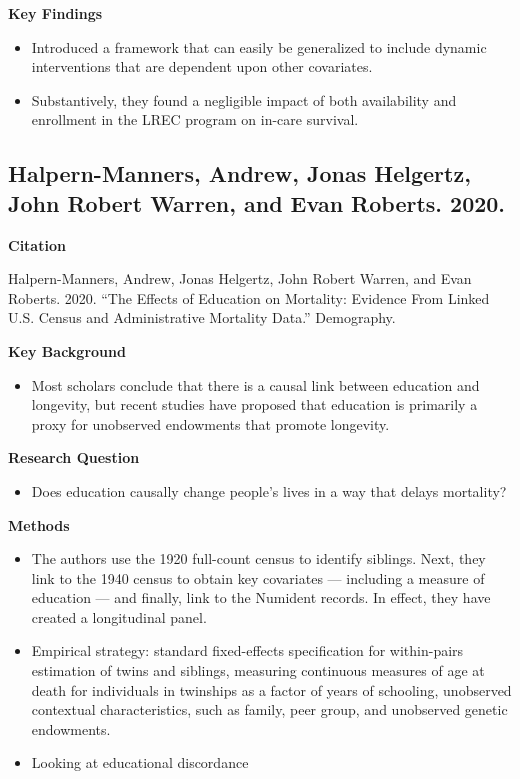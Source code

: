 \documentclass[
]{book}
\providecommand{\tightlist}{%
  \setlength{\itemsep}{0pt}\setlength{\parskip}{0pt}}
\begin{document}
\textbf{Key Findings}

\begin{itemize}
\tightlist
\item
  Introduced a framework that can easily be generalized to include dynamic interventions that are dependent upon other covariates.
\item
  Substantively, they found a negligible impact of both availability and enrollment in the LREC program on in-care survival.
\end{itemize}

\hypertarget{halpern-manners-andrew-jonas-helgertz-john-robert-warren-and-evan-roberts.-2020.}{%
\subsection{Halpern-Manners, Andrew, Jonas Helgertz, John Robert Warren, and Evan Roberts. 2020.}\label{halpern-manners-andrew-jonas-helgertz-john-robert-warren-and-evan-roberts.-2020.}}

\textbf{Citation}

Halpern-Manners, Andrew, Jonas Helgertz, John Robert Warren, and Evan Roberts. 2020. ``The Effects of Education on Mortality: Evidence From Linked U.S. Census and Administrative Mortality Data.'' Demography.

\textbf{Key Background}

\begin{itemize}
\tightlist
\item
  Most scholars conclude that there is a causal link between education and longevity, but recent studies have proposed that education is primarily a proxy for unobserved endowments that promote longevity.
\end{itemize}

\textbf{Research Question}

\begin{itemize}
\tightlist
\item
  Does education causally change people's lives in a way that delays mortality?
\end{itemize}

\textbf{Methods}

\begin{itemize}
\tightlist
\item
  The authors use the 1920 full-count census to identify siblings. Next, they link to the 1940 census to obtain key covariates --- including a measure of education --- and finally, link to the Numident records. In effect, they have created a longitudinal panel.\\
\item
  Empirical strategy: standard fixed-effects specification for within-pairs estimation of twins and siblings, measuring continuous measures of age at death for individuals in twinships as a factor of years of schooling, unobserved contextual characteristics, such as family, peer group, and unobserved genetic endowments.
\item
  Looking at educational discordance
\end{itemize}
\end{document}
